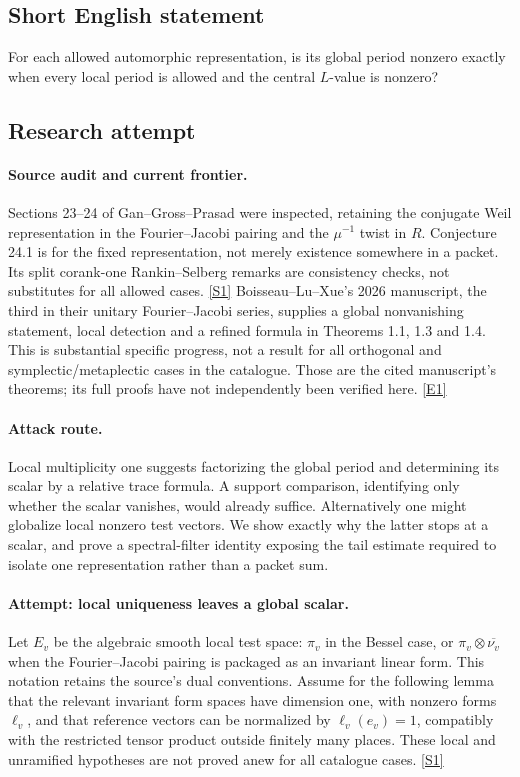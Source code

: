 \documentclass[11pt,a4paper]{article}
\newcommand{\sref}[2]{\hyperlink{source:#1:#2}{[S#2]}}
\newcommand{\eref}[2]{\hyperlink{extra:#1:#2}{[E#2]}}
\numberwithin{equation}{section}
\begin{document}
\subsection{Short English statement}
For each allowed automorphic representation, is its global period nonzero exactly when every local period is allowed and the central $L$-value is nonzero?
\subsection{Research attempt}

\paragraph{Source audit and current frontier.}
Sections 23--24 of Gan--Gross--Prasad were inspected, retaining the conjugate
Weil representation in the Fourier--Jacobi pairing and the $\mu^{-1}$ twist
in $R$. Conjecture 24.1 is for the fixed representation, not merely existence
somewhere in a packet. Its split corank-one Rankin--Selberg remarks are
consistency checks, not substitutes for all allowed cases. \sref{statement}{1}
Boisseau--Lu--Xue's 2026 manuscript, the third in their unitary
Fourier--Jacobi series, supplies a global nonvanishing statement, local
detection and a refined formula in Theorems 1.1, 1.3 and 1.4. This is substantial
specific progress, not a result for all orthogonal and symplectic/metaplectic
cases in the catalogue. Those are the cited manuscript's theorems; its full
proofs have not independently been verified here. \eref{statement}{1}

\paragraph{Attack route.}
Local multiplicity one suggests factorizing the global period and determining
its scalar by a relative trace formula. A support comparison, identifying
only whether the scalar vanishes, would already suffice. Alternatively one
might globalize local nonzero test vectors. We show exactly why the latter
stops at a scalar, and prove a spectral-filter identity exposing the tail
estimate required to isolate one representation rather than a packet sum.

\paragraph{Attempt: local uniqueness leaves a global scalar.}
Let $E_v$ be the algebraic smooth local test space: $\pi_v$ in the Bessel
case, or $\pi_v\otimes\overline{\nu_v}$ when the Fourier--Jacobi pairing
is packaged as an invariant linear form. This notation retains the source's
dual conventions. Assume for the following lemma that the relevant invariant
form spaces have dimension one, with nonzero forms $\ell_v$, and that
reference vectors can be normalized by $\ell_v(e_v)=1$, compatibly with the
restricted tensor product outside finitely many places. These local and
unramified hypotheses are not proved anew for all catalogue cases.
\sref{statement}{1}
\end{document}
